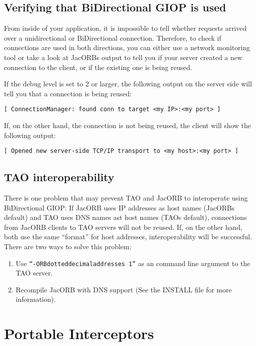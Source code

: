 \documentclass[12pt]{scrbook}
\begin{document}
\section{Verifying that BiDirectional GIOP is used}
From inside of your application, it is impossible to tell whether requests
arrived over a unidirectional or BiDirectional connection. Therefore, to check
if connections are used in both directions, you can either use a network
monitoring tool or take a look at JacORBs output to tell you if your server
created a new connection to the client, or if the existing one is being
reused.

If the debug level is set to 2 or larger, the following output on the server
side will tell you that a connection is being reused:

\begin{verbatim}
[ ConnectionManager: found conn to target <my IP>:<my port> ]
\end{verbatim}

If, on the other hand, the connection is not being reused, the client will
show the following output:
\begin{verbatim}
[ Opened new server-side TCP/IP transport to <my host>:<my port> ]
\end{verbatim}


\section{TAO interoperability}
There is one problem that may prevent TAO and JacORB to interoperate using
BiDirectional GIOP: If JacORB uses IP addresses as host names (JacORBs
default) and TAO uses DNS names ast host names (TAOs default), connections
from JacORB clients to TAO servers will not be reused. If, on the other hand,
both use the same ``format'' for host addresses, interoperability will be
successful. There are two ways to solve this problem:
\begin{enumerate}
\item Use {\tt ``-ORBdotteddecimaladdresses 1''} as an command line argument
  to the TAO server.
\item Recompile JacORB with DNS support (See the INSTALL file for more
  information). 
\end{enumerate}



\chapter{Portable Interceptors}
\end{document}
